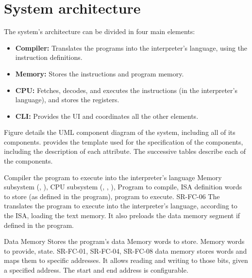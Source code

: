 \section{System architecture}\label{sec:architecture}
The system's architecture can be divided in four main elements:
\begin{itemize}
  \item \textbf{Compiler:} Translates the  programs into the \gls{interpreter}'s language, using the \gls{instruction} definitions.
  \item \textbf{Memory:} Stores the \glspl{instruction} and program memory.
  \item \textbf{\gls{CPU}:} Fetches, decodes, and executes the \glspl{instruction} (in the interpreter's language), and stores the registers.
  \item \textbf{\gls{CLI}:} Provides the \gls{UI} and coordinates all the other elements.
\end{itemize}

Figure  details the UML component diagram \parencite{Cook2017} of the system, including all of its components.  provides the template used for the specification of the components, including the description of each attribute. The successive tables describe each of the components.




\begin{component}{Compiler}
  { the program to execute into the interpreter's language}  %
  {Memory subsystem (, ), CPU subsystem (, , ), }  %
  {Program to compile, \gls{ISA} definition}  %
  { words to store (as defined in the program), program to execute.}  %
  {SR-FC-06}  %
  The  translates the  program to execute into the interpreter's language, according to the \gls{ISA}, loading the \gls{text memory}. It also preloads the \gls{data memory} segment if defined in the program.
\end{component}

\begin{component}{Data Memory}
  {Stores the program's data}  %
  {\NA}  %
  {Memory \glspl{word} to store.}  %
  {Memory \glspl{word} to provide, state.}  %
  {SR-FC-01, SR-FC-04, SR-FC-08}  %
  \Gls{data memory} stores \glspl{word} and maps them to specific addresses. It allows reading and writing to those bits, given a specified address. The start and end address is configurable.
\end{component}

